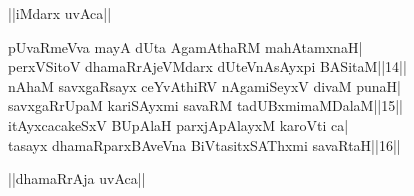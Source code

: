 \documentclass{article}
\begin{document}
\begin{center}
||iMdarx uvAca||
\end{center}

pUvaRmeVva mayA dUta AgamAthaRM mahAtamxnaH|\\
perxVSitoV dhamaRrAjeVMdarx dUteVnAsAyxpi BASitaM||14||\\
nAhaM savxgaRsayx ceYvAthiRV nAgamiSeyxV divaM punaH|\\
savxgaRrUpaM kariSAyxmi savaRM tadUBxmimaMDalaM||15||\\
itAyxcacakeSxV BUpAlaH parxjApAlayxM karoVti ca|\\
tasayx dhamaRparxBAveVna BiVtasitxSAThxmi savaRtaH||16||\\

\begin{center}
||dhamaRrAja uvAca||
\end{center}
\end{document}
